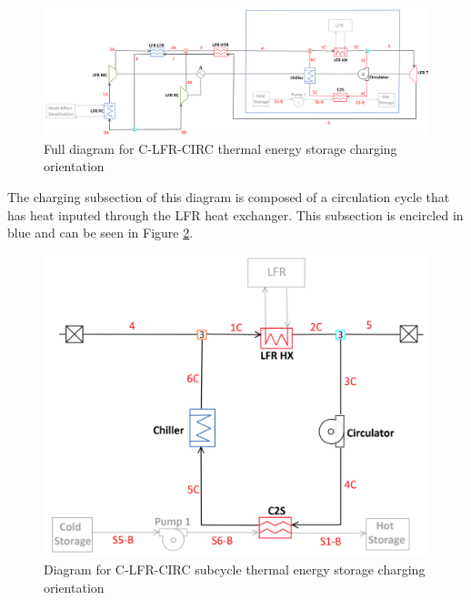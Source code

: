 \begin{figure}[H]
    \widefigure
    \includegraphics[width=\linewidth]{Definitions/c-lfr-circ.pdf}
    \caption{Full diagram for C-LFR-CIRC thermal energy storage charging orientation\label{c-lfr-circ}}
\end{figure}
\begin{paracol}{2}
\linenumbers
\switchcolumn

The charging subsection of this diagram is composed of a circulation cycle that has heat inputed through the LFR heat exchanger. This subsection is encircled in blue and can be seen in Figure \ref{c-lfr-circ-sub}.


\end{paracol}
\begin{figure}[H]
    \widefigure
    \includegraphics[width=10 cm]{Definitions/c-lfr-circ-sub.pdf}
    \caption{Diagram for C-LFR-CIRC subcycle thermal energy storage charging orientation\label{c-lfr-circ-sub}}
\end{figure}
